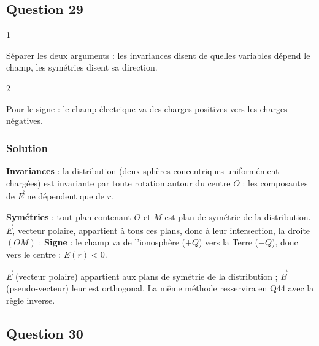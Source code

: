 \documentclass[11pt,a4paper]{article}
\newcommand{\equationajustee}[1]{%
  \sbox{\boiteequation}{$\displaystyle #1$}%
  \ifdim\wd\boiteequation>\linewidth
    \[\resizebox{\linewidth}{!}{\usebox{\boiteequation}}\]%
  \else
    \[#1\]%
  \fi}
\begin{document}
\hypertarget{question-29}{%
\subsection{Question 29}\label{question-29}}

\begin{indication}{1}

Séparer les deux arguments : les invariances disent de quelles variables dépend le champ, les symétries disent sa direction.

\end{indication}

\begin{indication}{2}

Pour le signe : le champ électrique va des charges positives vers les charges négatives.

\end{indication}

\hypertarget{solution-28}{%
\subsubsection{Solution}\label{solution-28}}

\textbf{Invariances} : la distribution (deux sphères concentriques uniformément chargées) est invariante par toute rotation autour du centre \(O\) : les composantes de \(\vec E\) ne dépendent que de \(r\).

\textbf{Symétries} : tout plan contenant \(O\) et \(M\) est plan de symétrie de la distribution. \(\vec E\), vecteur polaire, appartient à tous ces plans, donc à leur intersection, la droite \((OM)\) :
\equationajustee{\boxed{\vec E=E(r)\,\vec e_r}}
\textbf{Signe} : le champ va de l'ionosphère (\(+Q\)) vers la Terre (\(-Q\)), donc vers le centre : \(\boxed{E(r)<0}\).

\begin{methode}

\(\vec E\) (vecteur polaire) appartient aux plans de symétrie de la distribution ; \(\vec B\) (pseudo-vecteur) leur est orthogonal. La même méthode resservira en Q44 avec la règle inverse.

\end{methode}

\hypertarget{question-30}{%
\subsection{Question 30}\label{question-30}}
\end{document}
